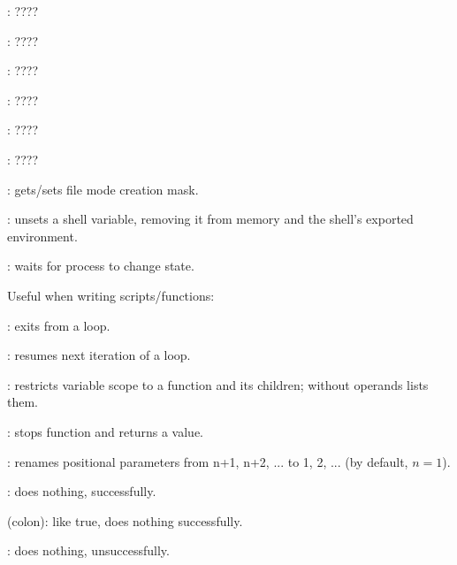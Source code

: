 \begin{compactenum}
\item [\symbolbash] : \dotfill ????

\item [\symbolbash] : \dotfill ????
\item [\symbolbash] : \dotfill ????

\item [\symbolbash] : \dotfill ????

\item [\symbolbash] : \dotfill ????

\item [\symbolbash] : \dotfill ????

\item [\symbolbash] : gets/sets file mode creation mask.


\item [\symbolbash] : unsets a shell variable, removing it from memory and the shell's exported environment.

\item [\symbolbash] : waits for process to change state.
\end{compactenum}

Useful when writing scripts/functions:

\begin{compactenum}
\item [\symbolbash] : exits from a loop.
\item [\symbolbash] : resumes next iteration of a loop.

\item [\symbolbash] : restricts variable scope to a function and its children; without operands lists them.

\item [\symbolbash] : stops function and returns a value.

\item [\symbolbash] : renames positional parameters from n+1, n+2, ... to 1, 2, ... (by default, $n = 1$).

\item [\symbolbash] : does nothing, successfully.
\item [\symbolbash] \commandbash{:} (colon): like true, does nothing successfully.
\item [\symbolbash] : does nothing, unsuccessfully.
\end{compactenum}

%